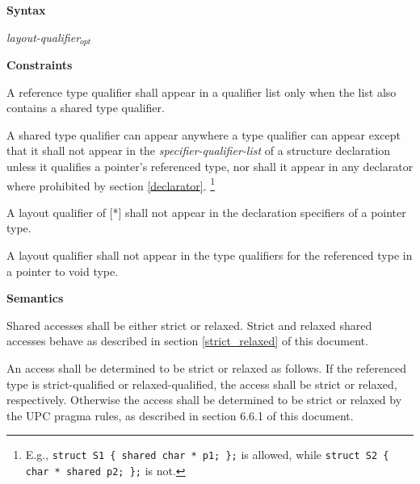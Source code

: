 {\bf Syntax} 


\hspace{3em}{\bf shared} {\em layout-qualifier$_{opt}$}


\hspace{3em}{\bf relaxed}

\hspace{3em}{\bf strict}



\hspace{3em}{\bf [ {\em *}  ]}

{\bf Constraints} 

\np A reference type qualifier shall appear in a qualifier
    list only when the list also contains a shared type qualifier.

\np A shared type qualifier can appear anywhere a type qualifier can appear
    except that it shall not appear in the {\em specifier-qualifier-list} of a structure
    declaration unless it qualifies a pointer's referenced type, nor shall it appear 
    in any declarator where prohibited by section \ref{declarator}.%
    \footnote{E.g., {\tt struct S1 \{ shared char * p1; \};} is allowed,
    while {\tt struct S2 \{ char * shared p2; \};} is not.}

\np A layout qualifier of [*] shall not appear in the
    declaration specifiers of a pointer type.

\np A layout qualifier shall not appear in the type
    qualifiers for the referenced type in a pointer to void type.

{\bf Semantics} 

\np Shared accesses shall be either strict or relaxed.
    Strict and relaxed shared accesses behave as described in section
    \ref{strict_relaxed} of this document.

\np An access shall be determined to be strict or relaxed
    as follows.  If the referenced type is strict-qualified or
    relaxed-qualified, the access shall be strict or relaxed,
    respectively.  Otherwise the access shall be determined to be
    strict or relaxed by the UPC pragma rules, as described in section
    6.6.1 of this document.

